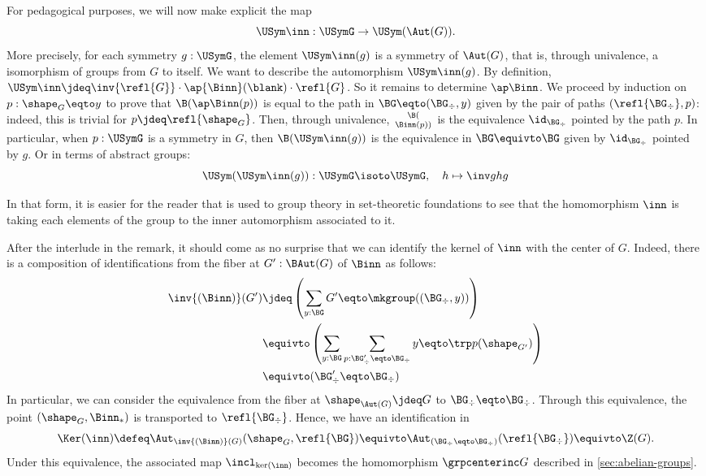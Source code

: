 \begin{remark}
  For pedagogical purposes, we will now make explicit the map
  \begin{displaymath}
    \USym\inn: \USymG \to \USym(\Aut(G)).
  \end{displaymath}
  More precisely, for each symmetry $g:\USymG$, the element $\USym\inn(g)$ is a
  symmetry of $\Aut(G)$, that is, through univalence, a isomorphism of groups
  from $G$ to itself. We want to describe the automorphism $\USym\inn(g)$. By
  definition,  
  $\USym\inn \jdeq \inv{\refl{G}} \cdot \ap {\Binn} (\blank) \cdot \refl{G}$. So it
  remains to determine $\ap \Binn$. We proceed by induction on
  $p:\sh_G \eqto y$ to prove that $\B(\ap\Binn(p))$ is equal to the path in
  $\BG \eqto (\BG_\div, y)$ given by the pair of paths $(\refl{\BG_\div}, p)$:
  indeed, this is trivial for $p\jdeq \refl{\sh_G}$. Then, through
  univalence, $\B(\atop\Binn(p))$ is the equivalence $\id_{\BG_\div}$ pointed by
  the path $p$. In particular, when $p:\USymG$ is a symmetry in $G$, then
  $\B(\USym\inn(g))$ is the equivalence in $\BG \equivto \BG$ given by
  $\id_{\BG_\div}$ pointed by $g$. Or in terms of abstract groups:
  \begin{displaymath}
    \USym(\USym\inn(g)) : \USymG \isoto \USymG, \quad h \mapsto \inv g h g
  \end{displaymath}

  In that form, it is easier for the reader that is used to group theory in
  set-theoretic foundations to see that the homomorphism $\inn$ is taking each
  elements of the group to the inner automorphism associated to it.
\end{remark}

After the interlude in the remark, it should come as no surprise that we can
identify the kernel of $\inn$ with the center of $G$. Indeed, there is a
composition of identifications from the fiber at $G':\BAut(G)$ of $\Binn$ as
follows:
\begin{align*}
  \inv{(\Binn)} (G') &\jdeq \left(  \sum_{y:\BG}G' \eqto \mkgroup((\BG_\div,y)) \right)
  \\
  &\equivto \left( \sum_{y:\BG}\sum_{p:\BG'_\div \eqto \BG_\div} y \eqto \trp p (\sh_{G'}) \right)
  \\
  &\equivto (\BG'_\div \eqto \BG_\div)
\end{align*}
In particular, we can consider the equivalence from the fiber at
$\sh_{\Aut(G)} \jdeq G$ to $\BG_\div \eqto \BG_\div$. Through this
equivalence, the point $(\sh_G,\Binn_{\ast})$ is transported to
$\refl{\BG_\div}$. Hence, we have an identification in
\begin{displaymath}
  \Ker(\inn) \defeq \Aut_{\inv{(\Binn)} (G)}(\sh_G, \refl{\BG})
  \equivto \Aut_{(\BG_\div \eqto \BG_\div)}(\refl{\BG_\div})
  \equivto \Z(G).
\end{displaymath}
Under this equivalence, the associated map $\incl_{\ker(\inn)}$ becomes the
homomorphism $\grpcenterinc G$ described in \cref{sec:abelian-groups}.

